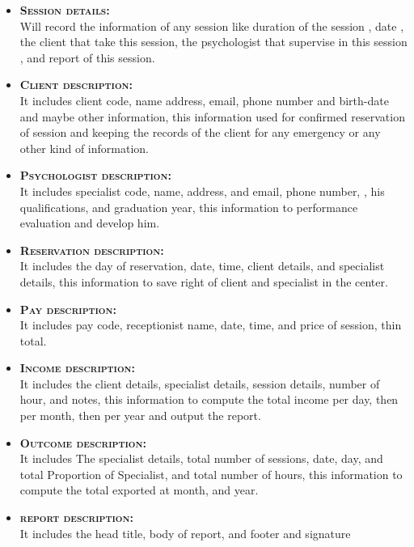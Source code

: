 \documentclass[../Psychological_system_web_application.tex]{subfiles}
\begin{document}
					\begin{itemize}
						\item
							\textbf{\textsc{\color{red}Session details:}}\\
							Will record the information of any session  like duration of the session , date , the client that take this session, the psychologist that supervise in this session , and report of this session.
						\item
							\textbf{\textsc{\color{red}Client description:}}\\
							It includes client code, name address, email, phone number and birth-date and maybe other information, this information used for confirmed reservation of session and keeping the records of the client for any emergency or any other kind of information.
						\item
							\textbf{\textsc{\color{red}Psychologist description:}}\\
							It includes specialist code, name, address, and email, phone number,  , his qualifications, and graduation year, this information to performance evaluation and develop him.
						\item
							\textbf{\textsc{\color{red}Reservation description:}}\\	
							It includes the day of reservation, date, time, client details, and specialist details, this information to save right of client and specialist in the center.
						\item
							\textbf{\textsc{\color{red}Pay description:}}\\
							It includes pay code, receptionist name, date, time, and price of session, thin total.
						\item
							\textbf{\textsc{\color{red}Income description:}}\\
							It includes the client details, specialist details, session details, number of hour, and notes, this information to compute the total income per day, then per month, then per year and output the report.
						\item
							\textbf{\textsc{\color{red}Outcome description:}}\\
							It includes The specialist details, total number of sessions, date, day, and total Proportion of Specialist, and total number of hours, this information to compute the total exported at month, and year.  
						\item
							\textbf{\textsc{\color{red}report description:}}\\
							It includes the head title, body of report, and footer and signature 
					\end{itemize}
\end{document}
